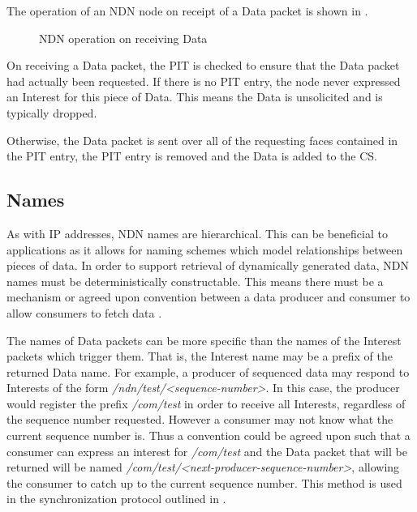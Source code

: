 The operation of an NDN node on receipt of a Data packet is shown in .
\begin{figure}[H]
    \centering
    \caption{NDN operation on receiving Data}
    \label{fig:ndn-on-data}
\end{figure}


On receiving a Data packet, the PIT is checked to ensure that the Data packet had actually been requested. If there is no PIT entry, the node never expressed an Interest for this piece of Data. This means the Data is unsolicited and is typically dropped.

Otherwise, the Data packet is sent over all of the requesting faces contained in the PIT entry, the PIT entry is removed and the Data is added to the CS.











\subsection{Names}\label{sec:ndn-names}
As with IP addresses, NDN names are hierarchical. This can be beneficial to applications as it allows for naming schemes which model relationships between pieces of data. In order to support retrieval of dynamically generated data, NDN names must be deterministically constructable. This means there must be a mechanism or agreed upon convention between a data producer and consumer to allow consumers to fetch data \cite{ndn-project}. 

The names of Data packets can be more specific than the names of the Interest packets which trigger them. That is, the Interest name may be a prefix of the returned Data name. For example, a producer of sequenced data may respond to Interests of the form \textit{/ndn/test/<sequence-number>}.  In this case, the producer would register the prefix \textit{/com/test} in order to receive all Interests, regardless of the sequence number requested. However a consumer may not know what the current sequence number is. Thus a convention could be agreed upon such that a consumer can express an interest for \textit{/com/test} and the Data packet that will be returned will be named \textit{/com/test/<next-producer-sequence-number>}, allowing the consumer to catch up to the current sequence number. This method is used in the synchronization protocol outlined in .














